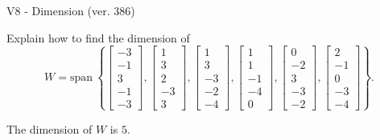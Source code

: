 \begin{exercise}
  \begin{exerciseTitle}V8 - Dimension (ver. 386)\end{exerciseTitle}
  \begin{exerciseStatement}
    Explain how to find the dimension of 
\[W=\mathrm{span}\ \left\{\left[\begin{array}{r}
-3 \\
-1 \\
3 \\
-1 \\
-3
\end{array}\right] , \left[\begin{array}{r}
1 \\
3 \\
2 \\
-3 \\
3
\end{array}\right] , \left[\begin{array}{r}
1 \\
3 \\
-3 \\
-2 \\
-4
\end{array}\right] , \left[\begin{array}{r}
1 \\
1 \\
-1 \\
-4 \\
0
\end{array}\right] , \left[\begin{array}{r}
0 \\
-2 \\
3 \\
-3 \\
-2
\end{array}\right] , \left[\begin{array}{r}
2 \\
-1 \\
0 \\
-3 \\
-4
\end{array}\right]\right\}.\]



  \end{exerciseStatement}
  \begin{exerciseAnswer}
   The dimension of \(W\) is  \(5\).
  


  \end{exerciseAnswer}
\end{exercise}